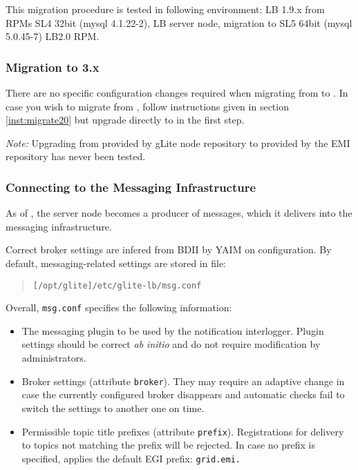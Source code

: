 This migration procedure is tested in following environment: LB 1.9.x
from RPMs SL4 32bit (mysql 4.1.22-2), LB server node, migration to SL5
64bit (mysql 5.0.45-7) LB2.0 RPM. 

\subsubsection{Migration to \LB 3.x}
\label{inst:migrate30}
There are no specific configuration changes required when migrating from  to . In case you wish to migrate from , follow instructions given in section \ref{inst:migrate20} but upgrade directly to  in the first step.

\emph{Note:} Upgrading from  provided by gLite \LB node repository to  provided by the EMI repository has never been tested.


\subsubsection{Connecting to the Messaging Infrastructure}
\label{inst:messaging}

As of , the \LB server node becomes a producer of messages, which it delivers into the messaging infrastructure.

Correct broker settings are infered from BDII by YAIM on configuration. By default, messaging-related settings are stored in file:

  \begin{quote}
	\begin{verbatim}
[/opt/glite]/etc/glite-lb/msg.conf
	\end{verbatim}
  \end{quote}

Overall, \texttt{msg.conf} specifies the following information:

\begin{itemize}
\item The messaging plugin to be used by the notification interlogger. Plugin settings should be correct \emph{ab initio} and do not require modification by administrators.
\item Broker settings (attribute \texttt{broker}). They may require an adaptive change in case the currently configured broker disappears and automatic checks fail to switch the settings to another one on time.
\item Permissible topic title prefixes (attribute \texttt{prefix}). Registrations for delivery to topics not matching the prefix will be rejected. In case no prefix is specified, \LB applies the default EGI prefix: \texttt{grid.emi.}
\end{itemize}


